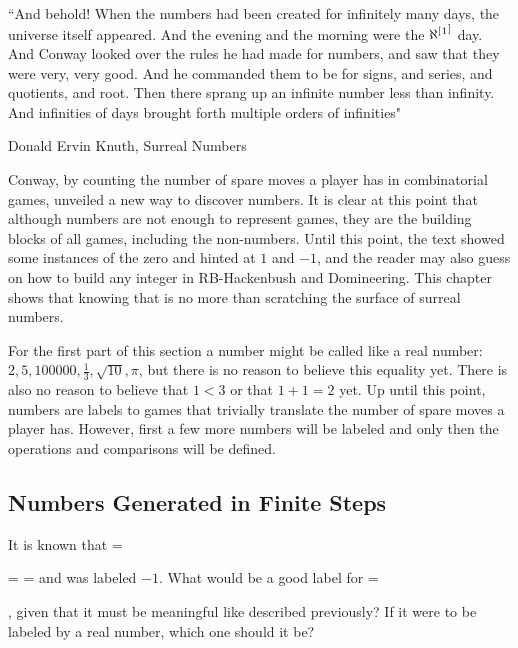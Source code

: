 \epigraph{``And behold! When the numbers had been created for infinitely many days, the universe itself appeared. And the evening and the morning were the $\aleph^[\footnotemark^]$ day. And Conway looked over the rules he had made for numbers, and saw that they were very, very good. And he commanded them to be for signs, and series, and quotients, and root. Then there sprang up an infinite number less than infinity. And infinities of days brought forth multiple orders of infinities"}{Donald Ervin Knuth, Surreal Numbers \footnotemark}




Conway, by counting the number of spare moves a player has in combinatorial games, unveiled a new way to discover numbers. It is clear at this point that although numbers are not enough to represent games, they are the building blocks of all games, including the non-numbers. Until this point, the text showed some instances of the zero and hinted at $1$ and $-1$, and the reader may also guess on how to build any integer in RB-Hackenbush and Domineering. This chapter shows that knowing that is no more than scratching the surface of surreal numbers.

For the first part of this section a number  might be called like a real number: $2, 5, 100000, \frac{1}{3}, \sqrt{10}, \pi$, but there is no reason to believe this equality yet. There is also no reason to believe that $1 < 3$ or that $1 + 1 = 2$ yet. Up until this point, numbers are labels to games that trivially translate the number of spare moves a player has. However, first a few more numbers will be labeled and only then the operations and comparisons will be defined.


\subsection*{Numbers Generated in Finite Steps}

It is known that \Gm{} =
 = \gam{}{\gam{}{}} =  and \Gm{} was labeled $-1$.
What would be a good label for \Hm = , given that it must be meaningful like described previously? If it were to be labeled by a real number, which one should it be?

